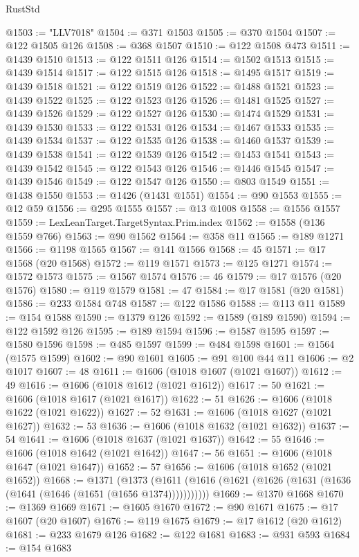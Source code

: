\begin{lexlean}{RustStd}
\begin{coremodule}
@1503 := "LLV7018"
@1504 := @371 @1503
@1505 := @370 @1504
@1507 := @122 @1505 @126
@1508 := @368 @1507
@1510 := @122 @1508 @473
@1511 := @1439 @1510
@1513 := @122 @1511 @126
@1514 := @1502 @1513
@1515 := @1439 @1514
@1517 := @122 @1515 @126
@1518 := @1495 @1517
@1519 := @1439 @1518
@1521 := @122 @1519 @126
@1522 := @1488 @1521
@1523 := @1439 @1522
@1525 := @122 @1523 @126
@1526 := @1481 @1525
@1527 := @1439 @1526
@1529 := @122 @1527 @126
@1530 := @1474 @1529
@1531 := @1439 @1530
@1533 := @122 @1531 @126
@1534 := @1467 @1533
@1535 := @1439 @1534
@1537 := @122 @1535 @126
@1538 := @1460 @1537
@1539 := @1439 @1538
@1541 := @122 @1539 @126
@1542 := @1453 @1541
@1543 := @1439 @1542
@1545 := @122 @1543 @126
@1546 := @1446 @1545
@1547 := @1439 @1546
@1549 := @122 @1547 @126
@1550 := @803 @1549
@1551 := @1438 @1550
@1553 := @1426 (@1431 @1551)
@1554 := @90 @1553
@1555 := @12 @59
@1556 := @295 @1555
@1557 := @13 @1008
@1558 := @1556 @1557
@1559 := LexLeanTarget.TargetSyntax.Prim.index
@1562 := @1558 (@136 @1559 @766)
@1563 := @90 @1562
@1564 := @358 @11
@1565 := @189 @1271
@1566 := @1198 @1565
@1567 := @141 @1566
@1568 := 45
@1571 := @17 @1568 (@20 @1568)
@1572 := @119 @1571
@1573 := @125 @1271
@1574 := @1572 @1573
@1575 := @1567 @1574
@1576 := 46
@1579 := @17 @1576 (@20 @1576)
@1580 := @119 @1579
@1581 := 47
@1584 := @17 @1581 (@20 @1581)
@1586 := @233 @1584 @748
@1587 := @122 @1586
@1588 := @113 @11
@1589 := @154 @1588
@1590 := @1379 @126
@1592 := @1589 (@189 @1590)
@1594 := @122 @1592 @126
@1595 := @189 @1594
@1596 := @1587 @1595
@1597 := @1580 @1596
@1598 := @485 @1597
@1599 := @484 @1598
@1601 := @1564 (@1575 @1599)
@1602 := @90 @1601
@1605 := @91 @100 @44 @11
@1606 := @2 @1017
@1607 := 48
@1611 := @1606 (@1018 @1607 (@1021 @1607))
@1612 := 49
@1616 := @1606 (@1018 @1612 (@1021 @1612))
@1617 := 50
@1621 := @1606 (@1018 @1617 (@1021 @1617))
@1622 := 51
@1626 := @1606 (@1018 @1622 (@1021 @1622))
@1627 := 52
@1631 := @1606 (@1018 @1627 (@1021 @1627))
@1632 := 53
@1636 := @1606 (@1018 @1632 (@1021 @1632))
@1637 := 54
@1641 := @1606 (@1018 @1637 (@1021 @1637))
@1642 := 55
@1646 := @1606 (@1018 @1642 (@1021 @1642))
@1647 := 56
@1651 := @1606 (@1018 @1647 (@1021 @1647))
@1652 := 57
@1656 := @1606 (@1018 @1652 (@1021 @1652))
@1668 := @1371
    (@1373 (@1611 (@1616 (@1621 (@1626 (@1631 (@1636 (@1641 (@1646 (@1651 (@1656 @1374)))))))))))
@1669 := @1370 @1668
@1670 := @1369 @1669
@1671 := @1605 @1670
@1672 := @90 @1671
@1675 := @17 @1607 (@20 @1607)
@1676 := @119 @1675
@1679 := @17 @1612 (@20 @1612)
@1681 := @233 @1679 @126
@1682 := @122 @1681
@1683 := @931 @593
@1684 := @154 @1683

\end{coremodule}
\end{lexlean}
